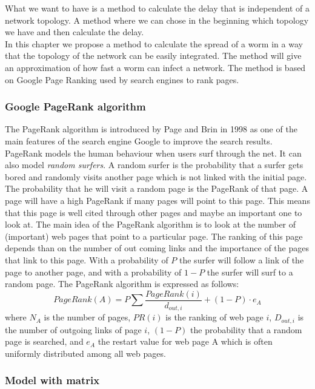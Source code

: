 What we want to have is a method to calculate the delay that is independent of a network topology. A method where we can chose in the beginning which topology we have and then calculate the delay.\\

In this chapter we propose a method to calculate the spread of a worm in a way that the topology of the network can be easily integrated. The method will give an approximation of how fast a worm can infect a network. The method is based on Google Page Ranking \cite{GoogleRank} used by search engines to rank pages. 

\subsubsection{Google PageRank algorithm}
The PageRank algorithm is introduced by Page and Brin in 1998 as one of the main features of the search engine Google to improve the search results. PageRank models the human behaviour when users surf through the net. It can also model \textit{random surfers}. A random surfer is the probability that a surfer gets bored and randomly visits another page which is not linked with the initial page. The probability that he will visit a random page is the PageRank of that page. A page will have a high PageRank if many pages will point to this page. This means that this page is well cited through other pages and maybe an important one to look at.    The main idea of the PageRank algorithm is to look at the number of (important) web pages that point to a particular page. The ranking of this page depends than on the number of out coming links and the importance of the pages that link to this page. With a probability of $P$ the surfer will follow a link of the page to another page, and with a probability of $1-P$ the surfer will surf to a random page. The PageRank algorithm is expressed as follows:
\begin{equation}
PageRank(A)=P \sum \dfrac{PageRank(i)}{d_{out,i}} + (1-P) \cdot e_{A}
\end{equation}
where $N_{A}$ is the number of pages, $PR(i)$ is the ranking of web page $i$, $D_{out,i}$ is the number of outgoing links of page $i$, $(1-P)$ the probability that a random page is searched, and $e_{A}$ the restart value for web page A which is often uniformly distributed among all web pages.

\subsubsection{Model with matrix}



